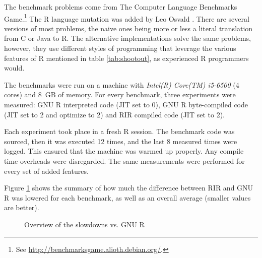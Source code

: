 The benchmark problems come from The Computer Language Benchmarks Game.\footnote{See \url{http://benchmarksgame.alioth.debian.org/}.} The R language mutation was added by Leo Osvald \autocite{shootout}. There are several versions of most problems, the naive ones being more or less a literal translation from C or Java to R. The alternative implementations solve the same problems, however, they use different styles of programming that leverage the various features of R mentioned in table \ref{tab:shootout}, as experienced R programmers would.

The benchmarks were run on a machine with \emph{Intel(R) Core(TM) i5-6500} (4 cores) and 8~GB of memory. For every benchmark, three experiments were measured: GNU R interpreted code (JIT set to 0), GNU R byte-compiled code (JIT set to 2 and optimize to 2) and RIR compiled code (JIT set to 2).

Each experiment took place in a fresh R session. The benchmark code was sourced, then it was executed 12 times, and the last 8 measured times were logged. This ensured that the machine was warmed up properly. Any compile time overheads were disregarded. The same measurements were performed for every set of added features.

Figure \ref{fig:overall} shows the summary of how much the difference between RIR and GNU R was lowered for each benchmark, as well as an overall average (smaller values are better).

\begin{figure}[htbp]
  \caption{\label{fig:overall}Overview of the slowdowns vs. GNU R}
  \centering
\end{figure}

